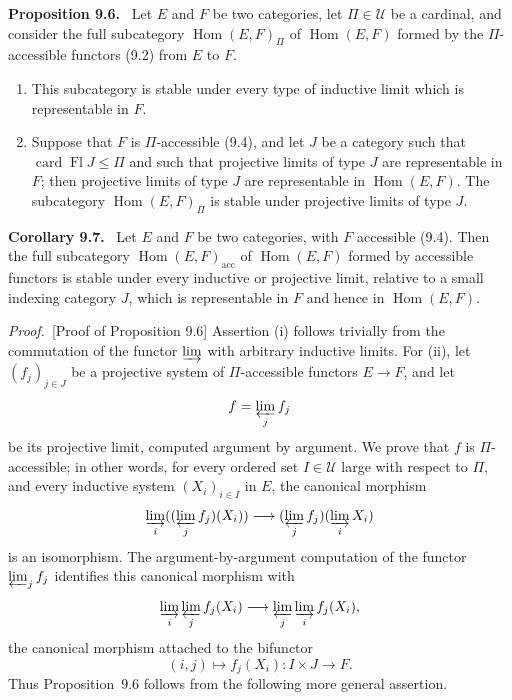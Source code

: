 \documentclass[11pt]{article}
\newcommand{\U}{\mathcal{U}}
\newcommand{\card}{\operatorname{card}}
\newcommand{\Fl}{\operatorname{Fl}}
\newcommand{\Hhom}{\operatorname{Hom}}
\newcommand{\acc}{\mathrm{acc}}
\newenvironment{statement}[1]{\par\medskip\noindent\textbf{#1.}\ }{\par\medskip}
\newenvironment{prooftext}{\par\noindent\emph{Proof.}\ }{\par\medskip}
\begin{document}
\begin{statement}{Proposition 9.6}
Let $E$ and $F$ be two categories, let $\Pi\in\U$ be a cardinal, and consider the full subcategory $\Hhom(E,F)_\Pi$ of $\Hhom(E,F)$ formed by the $\Pi$-accessible functors (9.2) from $E$ to $F$.
\begin{enumerate}[label=(\roman*)]
\item This subcategory is stable under every type of inductive limit which is representable in $F$.

\item Suppose that $F$ is $\Pi$-accessible (9.4), and let $J$ be a category such that $\card\Fl J\leq \Pi$ and such that projective limits of type $J$ are representable in $F$; then projective limits of type $J$ are representable in $\Hhom(E,F)$. The subcategory $\Hhom(E,F)_\Pi$ is stable under projective limits of type $J$.
\end{enumerate}
\end{statement}

\begin{statement}{Corollary 9.7}
Let $E$ and $F$ be two categories, with $F$ accessible (9.4). Then the full subcategory $\Hhom(E,F)_{\acc}$ of $\Hhom(E,F)$ formed by accessible functors is stable under every inductive or projective limit, relative to a small indexing category $J$, which is representable in $F$ and hence in $\Hhom(E,F)$.
\end{statement}

\begin{prooftext}[Proof of Proposition 9.6]
Assertion (i) follows trivially from the commutation of the functor $\varinjlim$ with arbitrary inductive limits. For (ii), let $(f_j)_{j\in J}$ be a projective system of $\Pi$-accessible functors $E\to F$, and let
\[
 f=\varprojlim_j f_j
\]
be its projective limit, computed argument by argument. We prove that $f$ is $\Pi$-accessible; in other words, for every ordered set $I\in\U$ large with respect to $\Pi$, and every inductive system $(X_i)_{i\in I}$ in $E$, the canonical morphism
\[
 \varinjlim_i ((\varprojlim_j f_j)(X_i))\longrightarrow
 (\varprojlim_j f_j)(\varinjlim_i X_i)
\]
is an isomorphism. The argument-by-argument computation of the functor $\varprojlim_j f_j$ identifies this canonical morphism with
\[
 \varinjlim_i \varprojlim_j f_j(X_i)
 \longrightarrow
 \varprojlim_j \varinjlim_i f_j(X_i),
\]
the canonical morphism attached to the bifunctor
\[
 (i,j)\longmapsto f_j(X_i):I\times J\longrightarrow F.
\]
Thus Proposition~9.6 follows from the following more general assertion.
\end{prooftext}
\end{document}

